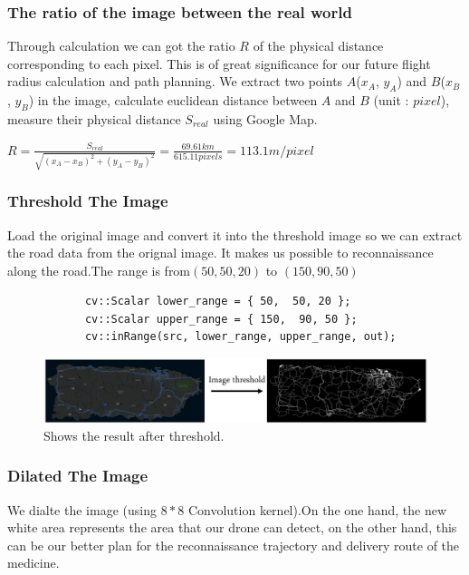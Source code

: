 \documentclass{article} %
\begin{document}
\subsubsection{The ratio of the image between the real world}

    Through calculation we can got the ratio $R$ of the physical distance corresponding to each pixel. 
    This is of great significance for our future flight radius calculation and path planning. We extract
    two points $A$($x_A$, $y_A$) and $B$($x_B$, $y_B$) in the image,  calculate euclidean distance between $A$ and $B$
    (unit : $pixel$), measure their physical distance $S_{real}$ using Google Map.
    
\centerline{$R=\frac{S_{real}}{\sqrt{\left(x_{A}-x_{B}\right)^{2}+\left(y_{A}-y_{B}\right)^{2}}} = \frac{69.61 km}{615.11 pixels} = 113.1 m/pixel$}

\subsubsection{Threshold The Image} 
    Load the original image and convert it into the threshold image so we can extract the road data from the orignal image.
    It makes us possible to reconnaissance along the road.The range is from$(50,  50, 20)$ to $(150,  90, 50)$

    \lstset {language=C++}
        \begin{lstlisting}
            cv::Scalar lower_range = { 50,  50, 20 };
            cv::Scalar upper_range = { 150,  90, 50 };	
            cv::inRange(src, lower_range, upper_range, out);
    \end{lstlisting}

    \begin{figure}[h]
        \centering
            \includegraphics[scale=0.6]{threshold.png}
        \caption{Shows the result after threshold.}
    \end{figure}
\subsubsection{Dilated The Image} 
    We dialte the image (using $8 * 8$ Convolution kernel).On the one hand, the new white area represents the area that our drone can detect, on the other hand, 
    this can be our better plan for the reconnaissance trajectory and delivery route of the medicine.
    
\end{document}

